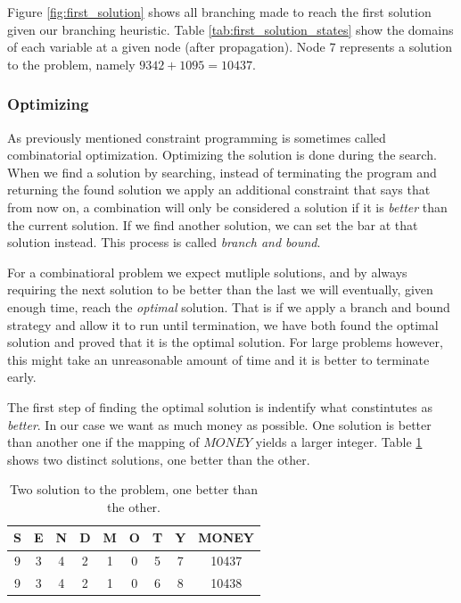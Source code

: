 Figure \ref{fig:first_solution} shows all branching made to reach the first solution given
our branching heuristic. Table \ref{tab:first_solution_states} show the domains of each
variable at a given node (after propagation). Node 7 represents a solution to the problem,
namely $9342+1095=10437$.

\subsubsection{Optimizing}
\label{sec:optimizing}

As previously mentioned constraint programming is sometimes called combinatorial optimization.
Optimizing the solution is done during the search. When we find a solution by searching,
instead of terminating the program and returning the found solution we apply an additional
constraint that says that from now on, a combination will only be considered a solution
if it is \textit{better} than the current solution. If we find another solution, we can
set the bar at that solution instead. This process is called \textit{branch and bound}.

For a combinatioral problem we expect mutliple solutions, and by always requiring the
next solution to be better than the last we will eventually, given enough time, reach
the \textit{optimal} solution. That is if we apply a branch and bound strategy and allow
it to run until termination, we have both found the optimal solution and proved that it is
the optimal solution. For large problems however, this might take an unreasonable amount
of time and it is better to terminate early.

The first step of finding the optimal solution is indentify what constintutes as \textit{
	better}. In our case we want as much money as possible. One solution is better than
another one if the mapping of $MONEY$ yields a larger integer. Table \ref{tab:two_solutions}
shows two distinct solutions, one better than the other.

\begin{table}
	\centering
	\begin{tabular}{c|c|c|c|c|c|c|c|c}
		S & E & N & D & M & O & T & Y & MONEY \\
		\hline
		9 & 3 & 4 & 2 & 1 & 0 & 5 & 7 & 10437 \\
		9 & 3 & 4 & 2 & 1 & 0 & 6 & 8 & 10438 \\
	\end{tabular}
	\caption{Two solution to the problem, one better than the other.}
	\label{tab:two_solutions}
\end{table}

